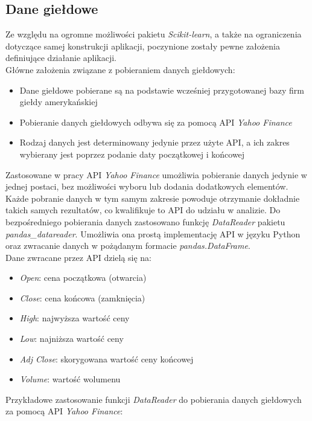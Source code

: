 \subsection{Dane giełdowe}

Ze względu na ogromne możliwości pakietu \textit{Scikit-learn}, a także na ograniczenia dotyczące samej konstrukcji aplikacji, poczynione zostały pewne założenia definiujące działanie aplikacji.\\

Główne założenia związane z pobieraniem danych giełdowych:
\begin{itemize}
 \item Dane giełdowe pobierane są na podstawie wcześniej przygotowanej bazy firm giełdy amerykańskiej
 \item Pobieranie danych giełdowych odbywa się za pomocą API \textit{Yahoo Finance}
 \item Rodzaj danych jest determinowany jedynie przez użyte API, a ich zakres wybierany jest poprzez podanie daty początkowej i końcowej\\
\end{itemize}

Zastosowane w pracy API \textit{Yahoo Finance} umożliwia pobieranie danych jedynie w jednej postaci, bez możliwości wyboru lub dodania dodatkowych elementów.
Każde pobranie danych w tym samym zakresie powoduje otrzymanie dokładnie takich samych rezultatów, co kwalifikuje to API do udziału w analizie.
Do bezpośredniego pobierania danych zastosowano funkcję \textit{DataReader} pakietu \textit{pandas\_datareader}.
Umożliwia ona prostą implementację API w języku Python oraz zwracanie danych w pożądanym formacie \textit{pandas.DataFrame}.\\

Dane zwracane przez API dzielą się na:
\begin{itemize}
 \item \textit{Open}: cena początkowa (otwarcia)
 \item \textit{Close}: cena końcowa (zamknięcia) 
 \item \textit{High}: najwyższa wartość ceny 
 \item \textit{Low}: najniższa wartość ceny 
 \item \textit{Adj Close}: skorygowana wartość ceny końcowej
 \item \textit{Volume}: wartość wolumenu
\end{itemize}

\newpage

Przykładowe zastosowanie funkcji \textit{DataReader} do pobierania danych giełdowych za pomocą API \textit{Yahoo Finance}:

